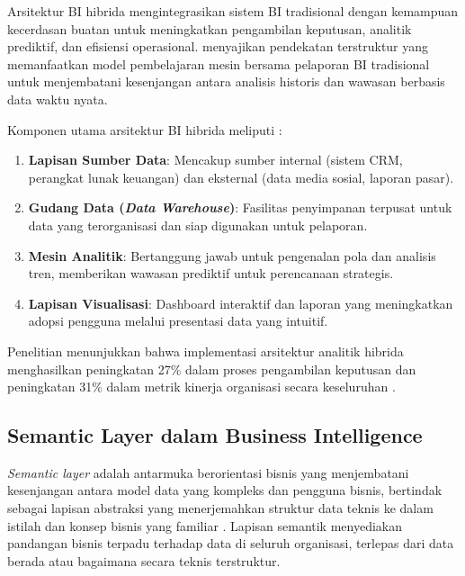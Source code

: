Arsitektur BI hibrida mengintegrasikan sistem BI tradisional dengan kemampuan kecerdasan buatan untuk meningkatkan pengambilan keputusan, analitik prediktif, dan efisiensi operasional. \textcite{shah2025hybrid} menyajikan pendekatan terstruktur yang memanfaatkan model pembelajaran mesin bersama pelaporan BI tradisional untuk menjembatani kesenjangan antara analisis historis dan wawasan berbasis data waktu nyata.

Komponen utama arsitektur BI hibrida meliputi \parencite{shah2025hybrid}:

\begin{enumerate}
\item \textbf{Lapisan Sumber Data}: Mencakup sumber internal (sistem CRM, perangkat lunak keuangan) dan eksternal (data media sosial, laporan pasar).

\item \textbf{Gudang Data (\textit{Data Warehouse})}: Fasilitas penyimpanan terpusat untuk data yang terorganisasi dan siap digunakan untuk pelaporan.

\item \textbf{Mesin Analitik}: Bertanggung jawab untuk pengenalan pola dan analisis tren, memberikan wawasan prediktif untuk perencanaan strategis.

\item \textbf{Lapisan Visualisasi}: Dashboard interaktif dan laporan yang meningkatkan adopsi pengguna melalui presentasi data yang intuitif.
\end{enumerate}

Penelitian menunjukkan bahwa implementasi arsitektur analitik hibrida menghasilkan peningkatan 27\% dalam proses pengambilan keputusan dan peningkatan 31\% dalam metrik kinerja organisasi secara keseluruhan \parencite{shah2025hybrid}.

\subsection{Semantic Layer dalam Business Intelligence}

\textit{Semantic layer} adalah antarmuka berorientasi bisnis yang menjembatani kesenjangan antara model data yang kompleks dan pengguna bisnis, bertindak sebagai lapisan abstraksi yang menerjemahkan struktur data teknis ke dalam istilah dan konsep bisnis yang familiar \parencite{databricks2025semantic}. Lapisan semantik menyediakan pandangan bisnis terpadu terhadap data di seluruh organisasi, terlepas dari  data berada atau bagaimana secara teknis terstruktur.

